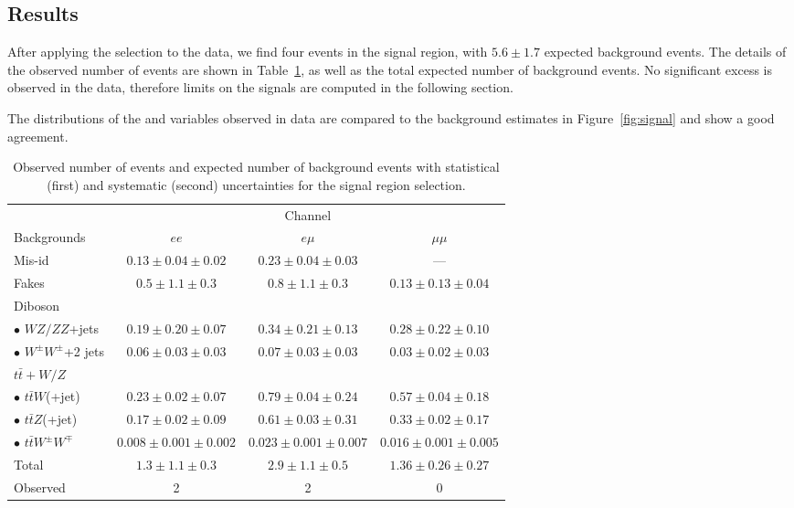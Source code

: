 \subsection{Results}\label{sect:results}
After applying the selection to the data, we find four events in the signal region, with $5.6\pm1.7$ 
expected background events. The details of the observed number of events are shown in 
Table~\ref{finalyield}, as well as the total expected number of background events. 
No significant excess is observed in the data, 
therefore limits on the signals are computed in the following section.

The distributions of the \met{} and \HT{} variables observed in data are compared to the background
estimates in Figure~\ref{fig:signal} and show a good agreement.

\begin{table}[t]
  \begin{center}
    \caption{Observed number of events and expected number of background events with 
        statistical (first) and systematic (second) uncertainties for the signal region
        selection.}\label{finalyield}
    \begin{tabular}{l|c|c|c}
      \hline\hline
       & \multicolumn{3}{c}{Channel} \\
      \cline{2-4}
      Backgrounds & $ee$ & $e\mu$ & $\mu\mu$ \\
      \hline
      Mis-id & $0.13\pm 0.04 \pm 0.02$ & $0.23\pm 0.04 \pm 0.03$ & --- \\
      Fakes & $0.5\pm 1.1 \pm 0.3$ & $0.8\pm 1.1 \pm 0.3$ & $0.13\pm 0.13\pm 0.04$ \\
      \hline
      Diboson & & & \\
      $\bullet$ $WZ/ZZ$+jets & $0.19\pm 0.20 \pm 0.07$ & $0.34\pm 0.21\pm 0.13$ & $0.28\pm 0.22\pm 0.10$ \\
      $\bullet$ $W^{\pm}W^\pm$+2 jets & $0.06\pm 0.03\pm 0.03$ & $0.07\pm 0.03\pm 0.03$ & $0.03\pm 0.02\pm 0.03$ \\
      \hline
      $t\bar{t}+W/Z$ & & & \\
      $\bullet$ $t\bar{t}W$(+jet) & $0.23\pm 0.02\pm 0.07$ & $0.79\pm 0.04\pm 0.24$ & $0.57\pm 0.04\pm 0.18$ \\
      $\bullet$ $t\bar{t}Z$(+jet) & $0.17\pm 0.02\pm 0.09$ & $0.61\pm 0.03\pm 0.31$ & $0.33\pm 0.02\pm 0.17$ \\
      $\bullet$ $t\bar{t}W^{\pm}W^\mp$ & $0.008\pm 0.001\pm 0.002$ & $0.023\pm 0.001\pm 0.007$ & $0.016\pm 0.001\pm 0.005$ \\
      \hline
      Total & $1.3 \pm 1.1 \pm 0.3$ & $2.9 \pm 1.1 \pm 0.5$ & $1.36 \pm 0.26 \pm 0.27$ \\
      \hline
      Observed & 2 & 2 & 0 \\
      \hline
    \end{tabular}
  \end{center}
\end{table}

